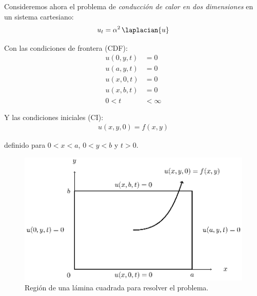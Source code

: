 Consideremos ahora el problema de \emph{conducción de calor en dos dimensiones} en un sistema cartesiano:
\begin{align}
u_{t} = \alpha^{2} \, \laplacian{u}
\label{eq:ecuacion_02_187}
\end{align}

Con las condiciones de frontera (CDF):
\begin{align}
u(0, y, t) &= 0 \label{eq:ecuacion_02_188} \\
u(a, y, t) &= 0 \label{eq:ecuacion_02_189} \\
u(x, 0, t) &= 0 \label{eq:ecuacion_02_190} \\
u(x, b, t) &= 0 \label{eq:ecuacion_02_191} \\
0 < t &< \infty \nonumber
\end{align}

Y las condiciones iniciales (CI):
\begin{align}
u(x, y, 0) = f (x, y) \label{eq:ecuacion_02_192}
\end{align}

definido para $0 < x < a$, $0  < y < b$ y $t > 0$.
\begin{figure}[H]
    \centering
    \includegraphics[scale=1.3]{Imagenes/Separacion_Variables_01_Lamina_Cuad.eps}
    \caption{Región de una lámina cuadrada para resolver el problema.}
    \label{fig:figura_lamina_cuadrada}
\end{figure}

